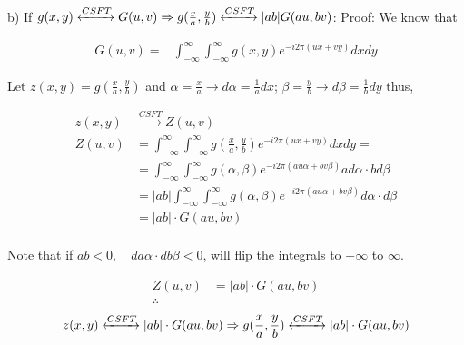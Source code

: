 \documentclass[11pt]{article}
\begin{document}
\begin{flushleft}
b) \newline
If $g(x,y) \xleftrightarrow{CSFT} G(u,v) \Rightarrow g(\frac{x}{a}, \frac{y}{b}) \xleftrightarrow{CSFT} |ab|G(au, bv)$:
\newline\newline
Proof:
\newline
We know that
\end{flushleft} 
\begin{equation*}
\begin{split}
G(u,v) = & \int_{-\infty}^{\infty} \int_{-\infty}^{\infty} g(x,y)e^{-i2\pi (ux + vy)} dxdy
\end{split}
\end{equation*}
\begin{flushleft}
Let $z(x, y) = g(\frac{x}{a}, \frac{y}{b} )$ and 
    $\alpha = \frac{x}{a} \rightarrow d\alpha = \frac{1}{a} dx$; 
    $\beta = \frac{y}{b} \rightarrow d\beta = \frac{1}{b} dy$
thus,
\end{flushleft} 
\begin{equation*}
\begin{split}
    z(x,y)  & \xrightarrow{CSFT} Z(u,v) \\
    Z(u,v)  & = \int_{-\infty}^{\infty} \int_{-\infty}^{\infty} g(\frac{x}{a},\frac{y}{b})e^{-i2\pi (ux + vy)} dxdy = \\ 
            & = \int_{-\infty}^{\infty} \int_{-\infty}^{\infty} g(\alpha,\beta)e^{-i2\pi (au\alpha + bv\beta)} ad\alpha \cdot bd\beta  \\
            & = |ab|\int_{-\infty}^{\infty} \int_{-\infty}^{\infty} g(\alpha,\beta)e^{-i2\pi (au\alpha + bv\beta)} d\alpha \cdot d\beta  \\    
            & = |ab| \cdot G(au, bv) \\
\end{split}
\end{equation*}
\begin{flushleft}
Note that if $ab < 0, \quad da\alpha \cdot db\beta < 0 $, will flip the integrals to $-\infty$ to $\infty$.
\end{flushleft} 
\begin{equation*}
\begin{split}
    Z(u,v) & = |ab| \cdot G(au, bv) \\
            \therefore{}
\end{split}
\end{equation*}
\begin{equation*}
\begin{split}
    z(x,y) \xleftrightarrow{CSFT} |ab| \cdot G(au, bv) \Rightarrow g(\frac{x}{a}, \frac{y}{b} ) \xleftrightarrow{CSFT} |ab| \cdot G(au, bv)
\end{split}
\end{equation*}
\end{document}

